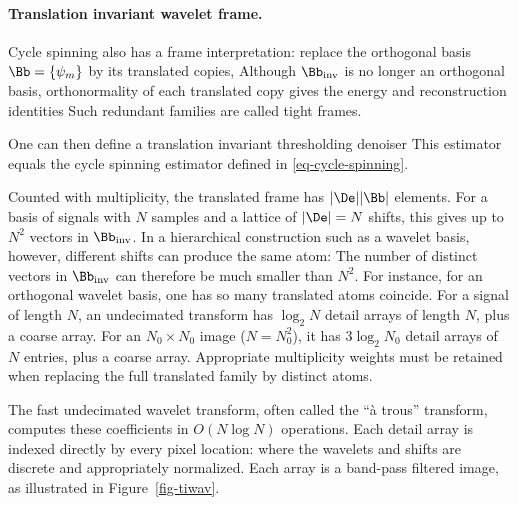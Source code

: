 
\paragraph{Translation invariant wavelet frame.}

Cycle spinning also has a frame interpretation: replace the orthogonal basis $\Bb = \{\psi_m\}$ by its translated copies,
Although $\Bb_{\text{inv}}$ is no longer an orthogonal basis, orthonormality of each translated copy gives the energy and reconstruction identities
Such redundant families are called tight frames.

One can then define a translation invariant thresholding denoiser
This estimator equals the cycle spinning estimator defined in \eqref{eq-cycle-spinning}.

Counted with multiplicity, the translated frame has $|\De| |\Bb|$ elements.
For a basis of signals with $N$ samples and a lattice of $|\De|=N$ shifts, this gives up to $N^2$ vectors in $\Bb_{\text{inv}}$. In a hierarchical construction such as a wavelet basis, however, different shifts can produce the same atom:
The number of distinct vectors in $\Bb_{\text{inv}}$ can therefore be much smaller than $N^2$.
For instance, for an orthogonal wavelet basis, one has
so many translated atoms coincide. For a signal of length $N$, an undecimated transform has $\log_2N$ detail arrays of length $N$, plus a coarse array. For an $N_0\times N_0$ image ($N=N_0^2$), it has $3\log_2N_0$ detail arrays of $N$ entries, plus a coarse array. Appropriate multiplicity weights must be retained when replacing the full translated family by distinct atoms.

The fast undecimated wavelet transform, often called the ``\`a trous'' transform, computes these coefficients in $O(N\log N)$ operations. Each detail array is indexed directly by every pixel location:
where the wavelets and shifts are discrete and appropriately normalized. Each array is a band-pass filtered image, as illustrated in Figure~\ref{fig-tiwav}.

